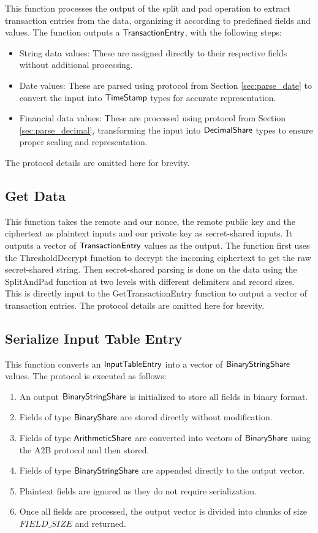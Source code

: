 This function processes the output of the split and pad operation to extract transaction entries from the data, organizing it according to predefined fields and values. The function outputs a ${\mathsf{TransactionEntry}}$, with the following steps:
\begin{itemize}
    \item String data values: These are assigned directly to their respective fields without additional processing.
    \item Date values: These are parsed using protocol from Section \ref{sec:parse_date} to convert the input into ${\mathsf{TimeStamp}}$ types for accurate representation.
    \item Financial data values: These are processed using protocol from Section \ref{sec:parse_decimal}, transforming the input into ${\mathsf{DecimalShare}}$ types to ensure proper scaling and representation.
\end{itemize}
The protocol details are omitted here for brevity.

\subsection{Get Data}
\label{sec:get_data}

This function takes the remote and our nonce, the remote public key and the ciphertext as plaintext inputs and our private key as secret-shared inputs. It outputs a vector of ${\mathsf{TransactionEntry}}$ values as the output. The function first uses the ThresholdDecrypt function to decrypt the incoming ciphertext to get the raw secret-shared string. Then secret-shared parsing is done on the data using the SplitAndPad function at two levels with different delimiters and record sizes. This is directly input to the GetTransactionEntry function to output a vector of transaction entries. The protocol details are omitted here for brevity.

\subsection{Serialize Input Table Entry} 
\label{sec:serialize_input_table_entry}

This function converts an ${\mathsf{InputTableEntry}}$ into a vector of ${\mathsf{BinaryStringShare}}$ values. The protocol is executed as follows:

\begin{enumerate}
    \item An output ${\mathsf{BinaryStringShare}}$ is initialized to store all fields in binary format.
    \item Fields of type ${\mathsf{BinaryShare}}$ are stored directly without modification.
    \item Fields of type ${\mathsf{ArithmeticShare}}$ are converted into vectors of ${\mathsf{BinaryShare}}$ using the A2B protocol and then stored.
    \item Fields of type ${\mathsf{BinaryStringShare}}$ are appended directly to the output vector.
    \item Plaintext fields are ignored as they do not require serialization.
    \item Once all fields are processed, the output vector is divided into chunks of size $FIELD\_SIZE$ and returned.
\end{enumerate}

